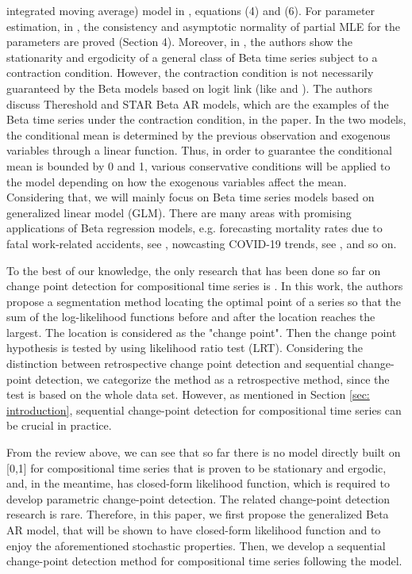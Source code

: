 \documentclass{article}
\theoremstyle{definition}
\begin{document}
integrated moving average) model in \cite{pumi2019beta}, equations (4) and (6). For parameter estimation, in \cite{pumi2019beta}, the consistency and asymptotic normality of partial MLE for the parameters are proved (Section 4). Moreover, in \cite{gorgi2021beta}, the authors show the stationarity and ergodicity of a general class of Beta time series subject to a contraction condition. However, the contraction condition is not necessarily guaranteed by the Beta models based on logit link (like \cite{rocha2009beta} and \cite{zheng2015generalized}). The authors discuss Thereshold and STAR Beta AR models, which are the examples of the Beta time series under the contraction condition, in the paper. In the two models, the conditional mean is determined by the previous observation and exogenous variables through a linear function. Thus, in order to guarantee the conditional mean is bounded by 0 and 1, various conservative conditions will be applied to the model depending on how the exogenous variables affect the mean. Considering that, we will mainly focus on Beta time series models based on generalized linear model (GLM). There are many areas with promising applications of Beta regression models, e.g. forecasting mortality rates due to fatal work-related accidents, see \cite{melchior2021forecasting}, nowcasting COVID-19 trends, see \cite{chakraborty2020nowcasting}, and so on.

To the best of our knowledge, the only research that has been done so far on change point detection for compositional time series is \cite{prabuchandran2019change}. In this work, the authors propose a segmentation method locating the optimal point of a series so that the sum of the log-likelihood functions before and after the location reaches the largest. The location is considered as the "change point". Then the change point hypothesis is tested by using likelihood ratio test (LRT). Considering the distinction between retrospective change point detection and sequential change-point detection, we categorize the method as a retrospective method, since the test is based on the whole data set. However, as mentioned in Section \ref{sec: introduction}, sequential change-point detection for compositional time series can be crucial in practice. 

From the review above, we can see that so far there is no model directly built on [0,1] for compositional time series that is proven to be stationary and ergodic, and, in the meantime, has closed-form likelihood function, which is required to develop parametric change-point detection. The related change-point detection research is rare. Therefore, in this paper, we first propose the generalized Beta AR model, that will be shown to have closed-form likelihood function and to enjoy the aforementioned stochastic properties.  Then, we develop a sequential change-point detection method for compositional time series following the model. 
\end{document}
